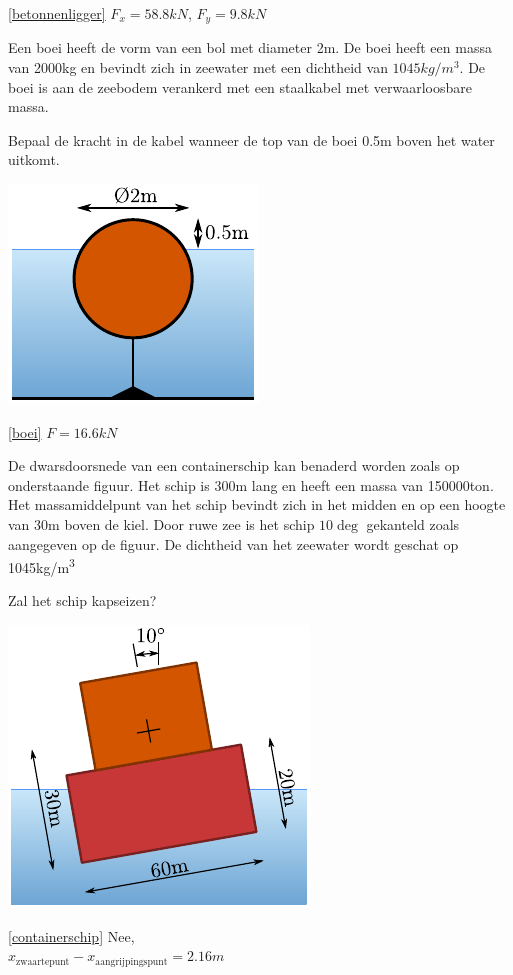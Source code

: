 	\begin{antwoord}{\ref{betonnenligger}}
		$F_x = 58.8\unit{kN}$, $F_y = 9.8\unit{kN}$
	\end{antwoord}
	\begin{toepassing}
		\label{boei}
Een boei heeft de vorm van een bol met diameter 2m. De boei heeft een massa van 2000kg en bevindt zich in zeewater met een dichtheid van $1045\unit{kg/m^3}$. De boei is aan de zeebodem verankerd met een staalkabel met verwaarloosbare massa.
		
Bepaal de kracht in de kabel wanneer de top van de boei 0.5m boven het water uitkomt.

\centering
\includegraphics{fig/hydrostatica/boei}
	\end{toepassing}
	\begin{antwoord}{\ref{boei}}
		$F = 16.6\unit{kN}$ 
	\end{antwoord}
	\begin{toepassing}
		\label{containerschip}
De dwarsdoorsnede van een containerschip kan benaderd worden zoals op onderstaande figuur. Het schip is 300m lang en heeft een massa van 150000ton. Het massamiddelpunt van het schip bevindt zich in het midden en op een hoogte van 30m boven de kiel. Door ruwe zee is het schip $10\deg$ gekanteld zoals aangegeven op de figuur. De dichtheid van het zeewater wordt geschat op 1045\unit{kg/m^3}
		
Zal het schip kapseizen?
		
\centering
\includegraphics{fig/hydrostatica/containerschip}
	\end{toepassing}
	\begin{antwoord}{\ref{containerschip}}
		Nee,\\ $x_\text{zwaartepunt}-x_\text{aangrijpingspunt} = 2.16\unit{m}$
	\end{antwoord}
	
